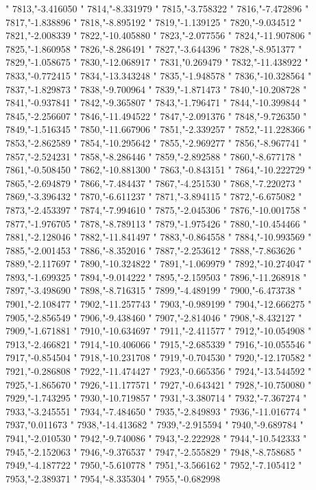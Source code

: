 "
7813,"-3.416050
"
7814,"-8.331979
"
7815,"-3.758322
"
7816,"-7.472896
"
7817,"-1.838896
"
7818,"-8.895192
"
7819,"-1.139125
"
7820,"-9.034512
"
7821,"-2.008339
"
7822,"-10.405880
"
7823,"-2.077556
"
7824,"-11.907806
"
7825,"-1.860958
"
7826,"-8.286491
"
7827,"-3.644396
"
7828,"-8.951377
"
7829,"-1.058675
"
7830,"-12.068917
"
7831,"0.269479
"
7832,"-11.438922
"
7833,"-0.772415
"
7834,"-13.343248
"
7835,"-1.948578
"
7836,"-10.328564
"
7837,"-1.829873
"
7838,"-9.700964
"
7839,"-1.871473
"
7840,"-10.208728
"
7841,"-0.937841
"
7842,"-9.365807
"
7843,"-1.796471
"
7844,"-10.399844
"
7845,"-2.256607
"
7846,"-11.494522
"
7847,"-2.091376
"
7848,"-9.726350
"
7849,"-1.516345
"
7850,"-11.667906
"
7851,"-2.339257
"
7852,"-11.228366
"
7853,"-2.862589
"
7854,"-10.295642
"
7855,"-2.969277
"
7856,"-8.967741
"
7857,"-2.524231
"
7858,"-8.286446
"
7859,"-2.892588
"
7860,"-8.677178
"
7861,"-0.508450
"
7862,"-10.881300
"
7863,"-0.843151
"
7864,"-10.222729
"
7865,"-2.694879
"
7866,"-7.484437
"
7867,"-4.251530
"
7868,"-7.220273
"
7869,"-3.396432
"
7870,"-6.611237
"
7871,"-3.894115
"
7872,"-6.675082
"
7873,"-2.453397
"
7874,"-7.994610
"
7875,"-2.045306
"
7876,"-10.001758
"
7877,"-1.976705
"
7878,"-8.789113
"
7879,"-1.975426
"
7880,"-10.454466
"
7881,"-2.128046
"
7882,"-11.841497
"
7883,"-0.864558
"
7884,"-10.993569
"
7885,"-2.001453
"
7886,"-8.352016
"
7887,"-2.253612
"
7888,"-7.863626
"
7889,"-2.117697
"
7890,"-10.324822
"
7891,"-1.069979
"
7892,"-10.274047
"
7893,"-1.699325
"
7894,"-9.014222
"
7895,"-2.159503
"
7896,"-11.268918
"
7897,"-3.498690
"
7898,"-8.716315
"
7899,"-4.489199
"
7900,"-6.473738
"
7901,"-2.108477
"
7902,"-11.257743
"
7903,"-0.989199
"
7904,"-12.666275
"
7905,"-2.856549
"
7906,"-9.438460
"
7907,"-2.814046
"
7908,"-8.432127
"
7909,"-1.671881
"
7910,"-10.634697
"
7911,"-2.411577
"
7912,"-10.054908
"
7913,"-2.466821
"
7914,"-10.406066
"
7915,"-2.685339
"
7916,"-10.055546
"
7917,"-0.854504
"
7918,"-10.231708
"
7919,"-0.704530
"
7920,"-12.170582
"
7921,"-0.286808
"
7922,"-11.474427
"
7923,"-0.665356
"
7924,"-13.544592
"
7925,"-1.865670
"
7926,"-11.177571
"
7927,"-0.643421
"
7928,"-10.750080
"
7929,"-1.743295
"
7930,"-10.719857
"
7931,"-3.380714
"
7932,"-7.367274
"
7933,"-3.245551
"
7934,"-7.484650
"
7935,"-2.849893
"
7936,"-11.016774
"
7937,"0.011673
"
7938,"-14.413682
"
7939,"-2.915594
"
7940,"-9.689784
"
7941,"-2.010530
"
7942,"-9.740086
"
7943,"-2.222928
"
7944,"-10.542333
"
7945,"-2.152063
"
7946,"-9.376537
"
7947,"-2.555829
"
7948,"-8.758685
"
7949,"-4.187722
"
7950,"-5.610778
"
7951,"-3.566162
"
7952,"-7.105412
"
7953,"-2.389371
"
7954,"-8.335304
"
7955,"-0.682998
